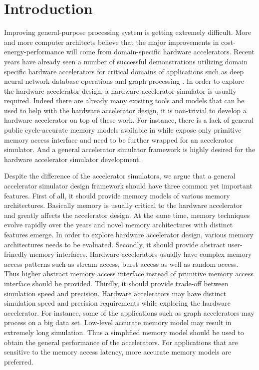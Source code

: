 \section{Introduction}
Improving general-purpose processing system is getting extremely 
difficult. More and more computer architects believe that the major 
improvements in cost-energy-performance will come from domain-specific 
hardware accelerators. Recent years have already seen a number of successful 
demonstrations utilizing domain specific hardware accelerators for critical 
domains of applications such as deep neural network \cite{Jouppi2017tpu, Li2017survey} 
database operations \cite{Wu2014q100} and graph processing \cite{Jun2016graphicionado, Ozdal2016energy}. 
In order to explore the hardware accelerator design, a hardware accelerator simulator 
is usually required. Indeed there are already many exisitng tools \cite{systemc, chisel} and 
models \cite{dramsim2, ramulator} that can be used to help with the hardware accelerator 
design, it is non-trivial to develop a hardware accelerator on top of these work. For instance, there 
is a lack of general public cycle-accurate memory models available in \cite{systemc, chisel} while 
\cite{dramsim2, ramulator} expose only primitive memory access interface and need to be further 
wrapped for an accelerator simulator. And a general accelerator simulator 
framework is highly desired for the hardware accelerator simulator development.

Despite the difference of the accelerator simulators, we argue that a general 
accelerator simulator design framework should have three common yet important 
features. First of all, it should provide memory models of various memory 
architectures. Basically memory is usually critical to the hardware accelerator 
and greatly affects the accelerator design. At the same time, memory techniques evolve rapidly 
over the years and novel memory architectures with distinct features emerge. In order to explore 
hardware accelerator design, various memory architectures needs to be evaluated. 
Secondly, it should provide abstract user-frinedly memory interfaces. Hardware accelerators 
usually have complex memory access patterns such as stream access, burst access as well as random access. 
Thus higher abstract memory access interface instead of primitive memory access interface should be provided. 
Thirdly, it should provide trade-off between simulation speed and precision. Hardware accelerators 
may have distinct simulation speed and precision requirements while exploring the hardware accelerator. 
For instance, some of the applications such as graph accelerators may process on a big data set. 
Low-level accurate memory model may result in extremely long simulation. Thus a simplified memory model 
should be used to obtain the general performance of the accelerators. For applications that are sensitive 
to the memory access latency, more accurate memory models are preferred.

